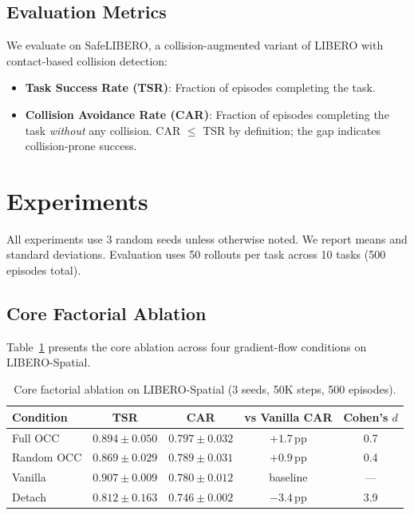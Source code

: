 \documentclass[letterpaper]{article}
\begin{document}
\subsection{Evaluation Metrics}

We evaluate on SafeLIBERO, a collision-augmented variant of LIBERO with contact-based collision detection:
\begin{itemize}
    \item \textbf{Task Success Rate (TSR)}: Fraction of episodes completing the task.
    \item \textbf{Collision Avoidance Rate (CAR)}: Fraction of episodes completing the task \emph{without} any collision. CAR $\leq$ TSR by definition; the gap indicates collision-prone success.
\end{itemize}

\section{Experiments}
\label{sec:exp}

All experiments use 3 random seeds unless otherwise noted. We report means and standard deviations. Evaluation uses 50 rollouts per task across 10 tasks (500 episodes total).

\subsection{Core Factorial Ablation}
\label{sec:exp-core}

Table~\ref{tab:core} presents the core ablation across four gradient-flow conditions on LIBERO-Spatial.

\begin{table}[h]
\centering
\caption{Core factorial ablation on LIBERO-Spatial (3 seeds, 50K steps, 500 episodes).}
\label{tab:core}
\begin{tabular}{lcccc}
\toprule
Condition & TSR & CAR & vs Vanilla CAR & Cohen's $d$ \\
\midrule
Full OCC     & $0.894 \pm 0.050$ & $\mathbf{0.797} \pm 0.032$ & $+1.7$\,pp & 0.7 \\
Random OCC   & $0.869 \pm 0.029$ & $0.789 \pm 0.031$          & $+0.9$\,pp & 0.4 \\
Vanilla      & $0.907 \pm 0.009$ & $0.780 \pm 0.012$          & baseline   & --- \\
Detach       & $0.812 \pm 0.163$ & $0.746 \pm 0.002$          & $-3.4$\,pp & 3.9 \\
\bottomrule
\end{tabular}
\end{table}
\end{document}
